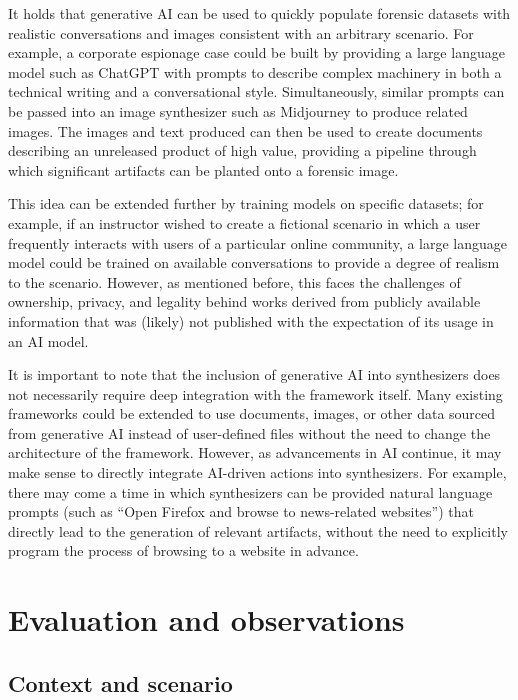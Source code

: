 \documentclass[letterpaper,12pt]{report}
\begin{document}
It holds that generative AI can be used to quickly populate forensic
datasets with realistic conversations and images consistent with an
arbitrary scenario. For example, a corporate espionage case could be
built by providing a large language model such as ChatGPT with prompts
to describe complex machinery in both a technical writing and a
conversational style. Simultaneously, similar prompts can be passed into
an image synthesizer such as Midjourney to produce related images. The
images and text produced can then be used to create documents describing
an unreleased product of high value, providing a pipeline through which
significant artifacts can be planted onto a forensic image.

This idea can be extended further by training models on specific
datasets; for example, if an instructor wished to create a fictional
scenario in which a user frequently interacts with users of a particular
online community, a large language model could be trained on available
conversations to provide a degree of realism to the scenario. However,
as mentioned before, this faces the challenges of ownership, privacy,
and legality behind works derived from publicly available information
that was (likely) not published with the expectation of its usage in an
AI model.

It is important to note that the inclusion of generative AI into
synthesizers does not necessarily require deep integration with the
framework itself. Many existing frameworks could be extended to use
documents, images, or other data sourced from generative AI instead of
user-defined files without the need to change the architecture of the
framework. However, as advancements in AI continue, it may make sense to
directly integrate AI-driven actions into synthesizers. For example,
there may come a time in which synthesizers can be provided natural
language prompts (such as ``Open Firefox and browse to news-related
websites'') that directly lead to the generation of relevant artifacts,
without the need to explicitly program the process of browsing to a
website in advance.

\chapter{Evaluation and observations}\label{chapter-seven}

\section{Context and scenario}\label{context-and-scenario}
\end{document}
